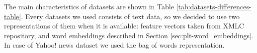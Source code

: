 \documentclass{article}
\newcommand{\Algo}[1]{\textsc{#1}}
\newcommand{\data}[3]{
    \begin{tabular}{ll}
    \rule{0pt}{0pt} #1 \\
    \rule{0pt}{0pt} #2 \\
    \rule{0pt}{0pt} #3 \\
    \end{tabular}
}
\newcommand{\databf}[3]{
    \textbf{
	\begin{tabular}{ll}
    \rule{0pt}{0pt} #1 \\
    \rule{0pt}{0pt} #2 \\
    \rule{0pt}{0pt} #3 \\
    \end{tabular}
	}
}
\begin{document}
The main characteristics of datasets are shown in Table \ref{tab:datasets-differences-table}. 
%
Every datasets we used consists of text data, so we decided to use two representations of them when it is available: feature vectors taken from XMLC repository, and word embeddings described in Section \ref{sec:plt-word_embeddings}. In case of Yahoo! news dataset we used the bag of words representation.

\end{document}
